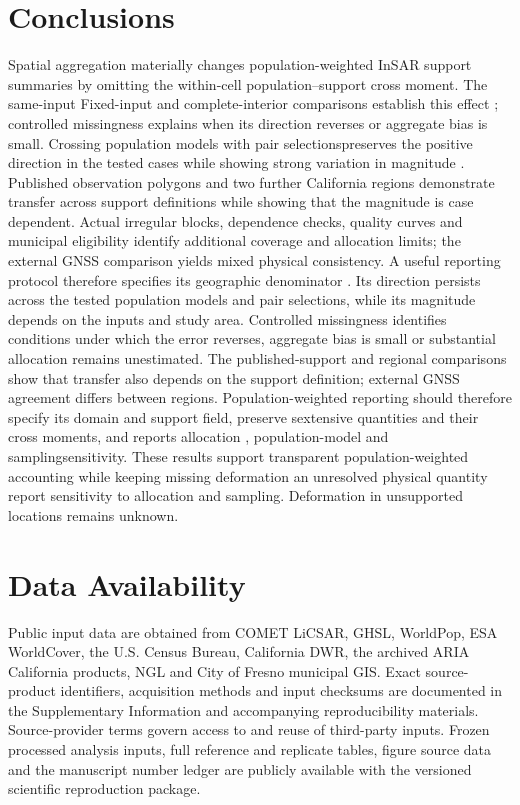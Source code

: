 \documentclass[pdflatex,sn-nature]{sn-jnl}
\providecommand{\DIFadd}[1]{{\protect\color{blue} \sf #1}} %
\providecommand{\DIFdel}[1]{{\protect\color{red} \scriptsize #1}} %
\providecommand{\DIFaddbegin}{} %
\providecommand{\DIFaddend}{} %
\providecommand{\DIFdelbegin}{} %
\providecommand{\DIFdelend}{} %
\begin{document}
\section{Conclusions}
Spatial aggregation \DIFdelbegin \DIFdel{materially }\DIFdelend changes population-weighted InSAR support summaries by omitting the within-cell population--support cross moment. \DIFdelbegin \DIFdel{The same-input }\DIFdelend \DIFaddbegin \DIFadd{Fixed-input }\DIFaddend and complete-interior comparisons establish this effect\DIFdelbegin \DIFdel{; controlled missingness explains when its direction reverses or aggregate bias is small. Crossing population models with pair selectionspreserves the positive direction in the tested cases while showing strong variation in magnitude . Published observation polygons and two further California regions demonstrate transfer across support definitions while showing that the magnitude is case dependent. Actual irregular blocks, dependence checks, quality curves and municipal eligibility identify additional coverage and allocation limits; the external GNSS comparison yields mixed physical consistency. A useful reporting protocol therefore specifies its geographic denominator }\DIFdelend \DIFaddbegin \DIFadd{. Its direction persists across the tested population models and pair selections, while its magnitude depends on the inputs and study area. Controlled missingness identifies conditions under which the error reverses, aggregate bias is small or substantial allocation remains unestimated. The published-support and regional comparisons show that transfer also depends on the support definition; external GNSS agreement differs between regions. Population-weighted reporting should therefore specify its domain }\DIFaddend and support field, preserve\DIFdelbegin \DIFdel{s}\DIFdelend  extensive quantities and their cross moments, and \DIFdelbegin \DIFdel{reports allocation , population-model and samplingsensitivity. These results support transparent population-weighted accounting while keeping missing deformation an unresolved physical quantity}\DIFdelend \DIFaddbegin \DIFadd{report sensitivity to allocation and sampling}\DIFaddend . \DIFaddbegin \DIFadd{Deformation in unsupported locations remains unknown.
}\DIFaddend 

\section*{Data Availability}
Public input data are obtained from COMET LiCSAR, GHSL, WorldPop, ESA WorldCover, the U.S. Census Bureau, California DWR, the archived ARIA California products, NGL and City of Fresno municipal GIS. Exact source-product identifiers, acquisition methods and input checksums are documented in the Supplementary Information and accompanying reproducibility materials. Source-provider terms govern access to and reuse of third-party inputs. Frozen processed analysis inputs, full reference and replicate tables, figure source data and the manuscript number ledger are publicly available with the versioned scientific reproduction package.
\end{document}
